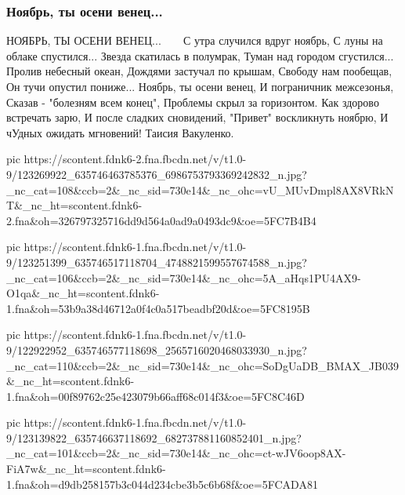  
 
 

\subsubsection{Ноябрь, ты осени венец...}

НОЯБРЬ, ТЫ ОСЕНИ ВЕНЕЦ...🍁🌿🍂🍁🌿🍂
С утра случился вдруг ноябрь,
С луны на облаке спустился...
Звезда скатилась в полумрак,
Туман над городом сгустился...
Пролив небесный океан,
Дождями застучал по крышам,
Свободу нам пообещав,
Он тучи опустил пониже...
Ноябрь, ты осени венец,
И пограничник межсезонья,
Сказав - "болезням всем конец",
Проблемы скрыл за горизонтом. 
Как здорово встречать зарю,
И после сладких сновидений,
"Привет" воскликнуть ноябрю,
И чУдных ожидать мгновений!
Таисия Вакуленко. 

\ifcmt
pic https://scontent.fdnk6-2.fna.fbcdn.net/v/t1.0-9/123269922_635746463785376_6986753793369242832_n.jpg?_nc_cat=108&ccb=2&_nc_sid=730e14&_nc_ohc=vU_MUvDmpl8AX8VRkNT&_nc_ht=scontent.fdnk6-2.fna&oh=326797325716dd9d564a0ad9a0493dc9&oe=5FC7B4B4

pic https://scontent.fdnk6-1.fna.fbcdn.net/v/t1.0-9/123251399_635746517118704_4748821599557674588_n.jpg?_nc_cat=106&ccb=2&_nc_sid=730e14&_nc_ohc=5A_aHqs1PU4AX9-O1qa&_nc_ht=scontent.fdnk6-1.fna&oh=53b9a38d46712a0f4c0a517beadbf20d&oe=5FC8195B

pic https://scontent.fdnk6-1.fna.fbcdn.net/v/t1.0-9/122922952_635746577118698_2565716020468033930_n.jpg?_nc_cat=110&ccb=2&_nc_sid=730e14&_nc_ohc=SoDgUaDB_BMAX_JB039&_nc_ht=scontent.fdnk6-1.fna&oh=00f89762c25e423079b66aff68c014f3&oe=5FC8C46D

pic https://scontent.fdnk6-1.fna.fbcdn.net/v/t1.0-9/123139822_635746637118692_682737881160852401_n.jpg?_nc_cat=101&ccb=2&_nc_sid=730e14&_nc_ohc=ct-wJV6oop8AX-FiA7w&_nc_ht=scontent.fdnk6-1.fna&oh=d9db258157b3c044d234cbe3b5c6b68f&oe=5FCADA81
\fi
